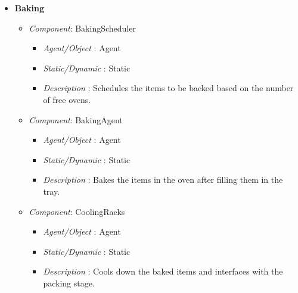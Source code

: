 \documentclass[11pt, a4paper]{article}
\begin{document}
\begin{itemize}
	\item \textbf{Baking}
	\begin{itemize}
	\item \textit{Component}: BakingScheduler
	\begin{itemize}
		\item \textit{Agent/Object} : Agent
		\item \textit{Static/Dynamic} : Static
		\item \textit{Description} : Schedules the items to be backed based on the number of free ovens.
	\end{itemize}
	\item \textit{Component}: BakingAgent
	\begin{itemize}
		\item \textit{Agent/Object} : Agent
		\item \textit{Static/Dynamic} : Static
		\item \textit{Description} : Bakes the items in the oven after filling them in the tray.
	\end{itemize}
	\item \textit{Component}: CoolingRacks
	\begin{itemize}
		\item \textit{Agent/Object} : Agent
		\item \textit{Static/Dynamic} : Static
		\item \textit{Description} : Cools down the baked items and interfaces with the packing stage.
	\end{itemize}
	\end{itemize}


\end{itemize}
\end{document}
